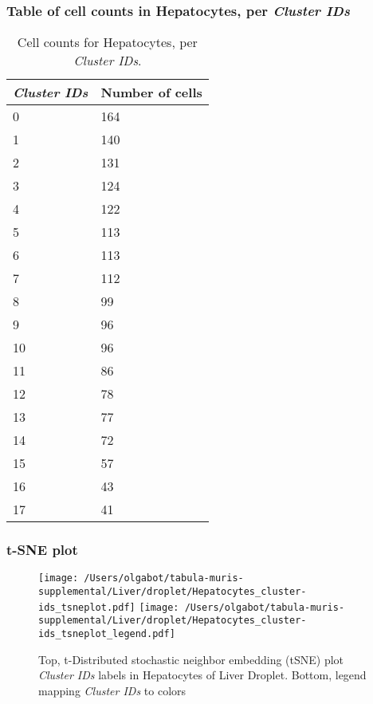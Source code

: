 \subsubsection{Table of cell counts in Hepatocytes, per \emph{Cluster IDs}}\begin{table}[h]
\centering
\label{my-label}
\begin{tabular}{@{}ll@{}}
\toprule

\emph{Cluster IDs}& Number of cells \\ \midrule
0 & 164 \\

1 & 140 \\

2 & 131 \\

3 & 124 \\

4 & 122 \\

5 & 113 \\

6 & 113 \\

7 & 112 \\

8 & 99 \\

9 & 96 \\

10 & 96 \\

11 & 86 \\

12 & 78 \\

13 & 77 \\

14 & 72 \\

15 & 57 \\

16 & 43 \\

17 & 41 \\
\bottomrule
\end{tabular}
\caption{Cell counts for Hepatocytes, per \emph{Cluster IDs}.}
\end{table}

\clearpage
\subsubsection{t-SNE plot}
\begin{figure}[h]
\centering
\texttt{[image: /Users/olgabot/tabula-muris-supplemental/Liver/droplet/Hepatocytes\_cluster-ids\_tsneplot.pdf]}
\texttt{[image: /Users/olgabot/tabula-muris-supplemental/Liver/droplet/Hepatocytes\_cluster-ids\_tsneplot\_legend.pdf]}
\caption{Top, t-Distributed stochastic neighbor embedding (tSNE) plot  \emph{Cluster IDs} labels in Hepatocytes of Liver Droplet. Bottom, legend mapping \emph{Cluster IDs} to colors}
\end{figure}


